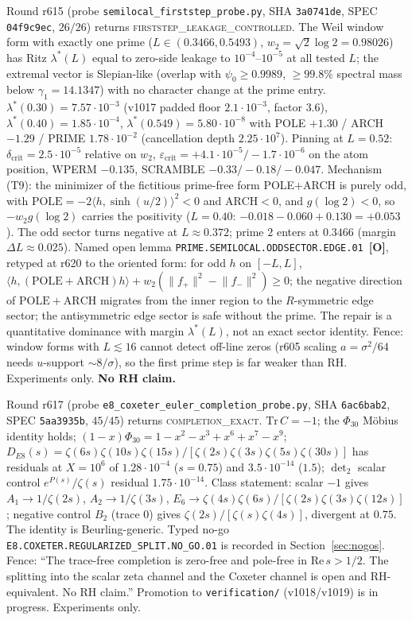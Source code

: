 \documentclass[11pt]{article}
\newcommand{\mO}{\textcolor{openred}{\textbf{[O]}}}
\theoremstyle{definition}
\theoremstyle{remark}
\begin{document}
\noindent Round r615 (probe \texttt{semilocal\_firststep\_probe.py},
SHA \texttt{3a0741de}, SPEC \texttt{04f9c9ec}, $26/26$) returns
\textsc{firststep\_leakage\_controlled}.  The Weil window form with
exactly one prime ($L\in(0.3466,0.5493)$,
$w_2=\sqrt{2}\log 2=0.98026$) has Ritz $\lambda^*(L)$ equal to
zero-side leakage to $10^{-4}$--$10^{-5}$ at all tested $L$; the
extremal vector is Slepian-like (overlap with $\psi_0\ge 0.9989$,
$\ge 99.8\%$ spectral mass below $\gamma_1=14.1347$) with no
character change at the prime entry.
$\lambda^*(0.30)=7.57\cdot10^{-3}$ (v1017 padded floor
$2.1\cdot10^{-3}$, factor $3.6$),
$\lambda^*(0.40)=1.85\cdot10^{-4}$,
$\lambda^*(0.549)=5.80\cdot10^{-8}$ with POLE $+1.30$ / ARCH $-1.29$ /
PRIME $1.78\cdot10^{-2}$ (cancellation depth $2.25\cdot10^{7}$).
Pinning at $L=0.52$: $\delta_{\mathrm{crit}}=2.5\cdot10^{-5}$
relative on $w_2$, $\varepsilon_{\mathrm{crit}}=+4.1\cdot10^{-5}/-1.7\cdot10^{-6}$
on the atom position, WPERM $-0.135$, SCRAMBLE $-0.33/-0.18/-0.047$.
Mechanism (T9): the minimizer of the fictitious prime-free form
POLE$+$ARCH is purely odd, with
$\mathrm{POLE}=-2\langle h,\sinh(u/2)\rangle^2<0$ and $\mathrm{ARCH}<0$,
and $g(\log 2)<0$, so $-w_2 g(\log 2)$ carries the positivity
($L=0.40$: $-0.018-0.060+0.130=+0.053$).  The odd sector turns
negative at $L\approx 0.372$; prime $2$ enters at $0.3466$
(margin $\Delta L\approx 0.025$).  Named open lemma
\texttt{PRIME.SEMILOCAL.ODDSECTOR.EDGE.01}~\mO, retyped at r620
to the oriented form: for odd $h$ on $[-L,L]$,
$\langle h,(\mathrm{POLE}+\mathrm{ARCH})h\rangle
+w_2(\lVert f_+\rVert^2-\lVert f_-\rVert^2)\ge 0$;
the negative direction of $\mathrm{POLE}+\mathrm{ARCH}$ migrates
from the inner region to the $R$-symmetric edge sector; the
antisymmetric edge sector is safe without the prime.  The
repair is a quantitative dominance with margin $\lambda^*(L)$,
not an exact sector identity.
Fence: window forms with $L\lesssim 16$ cannot detect off-line zeros
(r605 scaling $a=\sigma^2/64$ needs $u$-support $\sim 8/\sigma$), so
the first prime step is far weaker than RH.  Experiments only.
\textbf{No RH claim.}

\noindent Round r617 (probe \texttt{e8\_coxeter\_euler\_completion\_probe.py},
SHA \texttt{6ac6bab2}, SPEC \texttt{5aa3935b}, $45/45$) returns
\textsc{completion\_exact}.
$\mathrm{Tr}\,C=-1$; the $\Phi_{30}$ M\"obius identity holds;
$(1-x)\Phi_{30}=1-x^2-x^3+x^6+x^7-x^9$;
$D_{E8}(s)=\zeta(6s)\zeta(10s)\zeta(15s)/[\zeta(2s)\zeta(3s)\zeta(5s)\zeta(30s)]$
has residuals at $X=10^6$ of $1.28\cdot10^{-4}$ ($s=0.75$) and
$3.5\cdot10^{-14}$ ($1.5$); $\det_2$ scalar control
$e^{P(s)}/\zeta(s)$ residual $1.75\cdot10^{-14}$.  Class statement:
scalar $-1$ gives $A_1\to 1/\zeta(2s)$, $A_2\to 1/\zeta(3s)$,
$E_6\to\zeta(4s)\zeta(6s)/[\zeta(2s)\zeta(3s)\zeta(12s)]$; negative
control $B_2$ (trace $0$) gives $\zeta(2s)/[\zeta(s)\zeta(4s)]$,
divergent at $0.75$.  The identity is Beurling-generic.  Typed no-go
\texttt{E8.COXETER.REGULARIZED\_SPLIT.NO\_GO.01} is recorded in
Section~\ref{sec:nogos}.  Fence: ``The trace-free completion is
zero-free and pole-free in $\mathrm{Re}\,s>1/2$. The splitting into
the scalar zeta channel and the Coxeter channel is open and
RH-equivalent. No RH claim.''  Promotion to \texttt{verification/}
(v1018/v1019) is in progress.  Experiments only.
\end{document}
